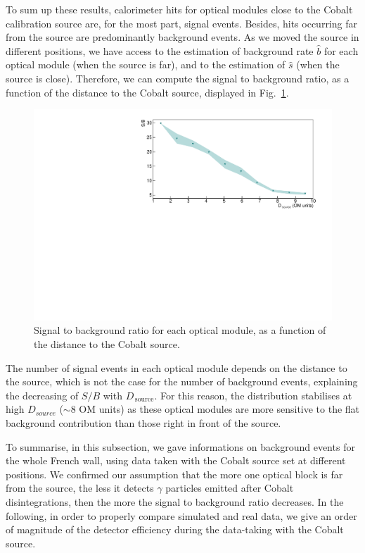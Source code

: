 To sum up these results, calorimeter hits for optical modules close to the Cobalt calibration source are, for the most part, signal events.
Besides, hits occurring far from the source are predominantly background events.
As we moved the source in different positions, we have access to the estimation of background rate $\hat{b}$ for each optical module (when the source is far), and to the estimation of $\hat{s}$ (when the source is close).
Therefore, we can compute the signal to background ratio, as a function of the distance to the Cobalt source, displayed in Fig.~\ref{fig:Co_ratioSB}.
\begin{figure}[h]
  \centering
  \includegraphics[width=1.1\textwidth]{commissioning/fig_commissioning/Co_ratioSB_distance.pdf}
  \caption{Signal to background ratio for each optical module, as a function of the distance to the Cobalt source.
    \label{fig:Co_ratioSB}}
\end{figure}
The number of signal events in each optical module depends on the distance to the source, which is not the case for the number of background events, explaining the decreasing of $S/B$ with $D_{\,\text{source}}$.
For this reason, the distribution stabilises at high $D_{source}$ ($\sim8$ OM units) as these optical modules are more sensitive to the flat background contribution than those right in front of the source.

To summarise, in this subsection, we gave informations on background events for the whole French wall, using data taken with the Cobalt source set at different positions.
We confirmed our assumption that the more one optical block is far from the source, the less it detects $\gamma$ particles emitted after Cobalt disintegrations, then the more the signal to background ratio decreases.
In the following, in order to properly compare simulated and real data, we give an order of magnitude of the detector efficiency during the data-taking with the Cobalt source.

